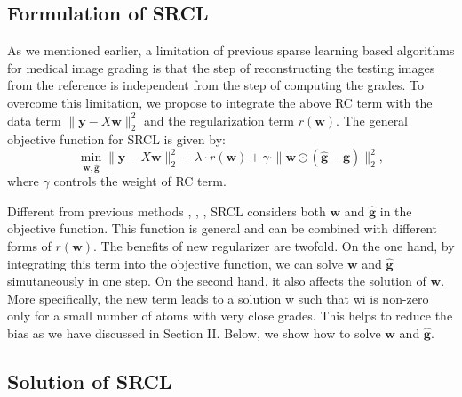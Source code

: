 \documentclass[journal]{IEEEtran}
\begin{document}
 \subsection{Formulation of SRCL}
 As we mentioned earlier, a limitation of previous sparse learning based algorithms for medical image grading is that the step of   reconstructing the testing images from the reference is independent from the step of computing the grades.  To overcome this limitation,  we propose to integrate  the above RC  term with the data term
 $\|\textbf{y}-X\textbf{w}\|^2_2$  and the regularization term $r(\textbf{w})$. The  general objective function for SRCL is given by:
  \begin{equation}
  \min_{\textbf{w},\hat{\textbf{g}}} \|\textbf{y}-X\textbf{w}\|^2_2+ \lambda \cdot r(\textbf{w}) +\gamma  \cdot \|\textbf{w}\odot (\hat{\textbf{g}} -\textbf{g})  \|_2^2, \label{srlobj}
  \end{equation}
  where $\gamma$ controls the weight
  of RC term.
  
  Different from previous methods \cite{sparsecoding}, \cite{CJ15}, \cite{sparseGroupLasso}, SRCL considers both $\textbf{w}$ and $\hat{\textbf{g}}$ in the objective function.  This function is general and can be combined with different forms of  $r(\textbf{w})$. The benefits of new regularizer are twofold. On the one hand,
  by integrating this term into the objective function, we can
  solve $\textbf{w}$ and ${\hat{\textbf{g}}}$ simutaneously in one step. On the second hand,
  it also affects the solution of $\textbf{w}$. More specifically, the new
  term leads to a solution w such that wi is non-zero only for
  a small number of atoms with very close grades. This helps
  to reduce the bias as we have discussed in Section II.  
  Below, we show how to solve $\textbf{w}$ and $\hat{{\textbf{g}}}$.
  
   \subsection{Solution of SRCL} \label{solution}
  
\end{document}

